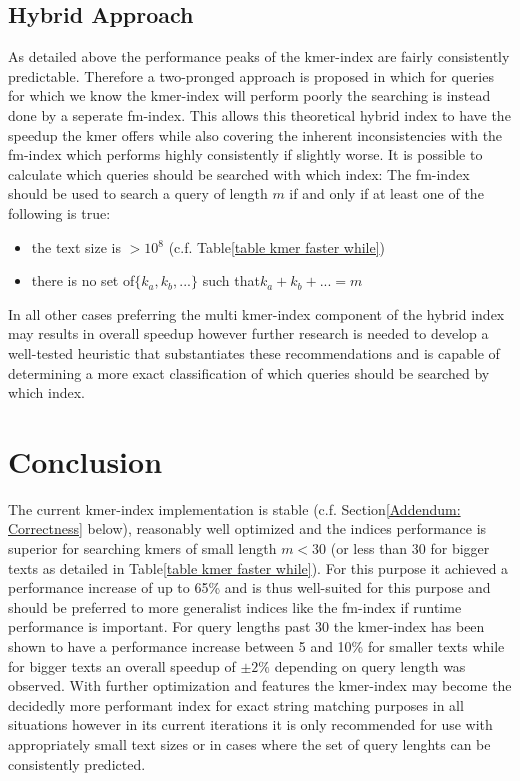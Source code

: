 \section{Hybrid Approach}
As detailed above the performance peaks of the kmer-index are fairly
consistently predictable. Therefore a two-pronged approach is proposed in which
for queries for which we know the kmer-index will perform poorly the
searching is instead done by a seperate fm-index. This allows this theoretical hybrid index
to have the speedup the kmer offers while also covering the inherent inconsistencies with the fm-index
which performs highly consistently if slightly worse. It is possible to calculate
which queries should be searched with which index: The fm-index should be used to
search a query of length $m$ if and only if at least one of the following is true:
\begin{itemize}
\item the text size is $>10{{}^8}$ (c.f. Table\ref{table kmer faster while})
\item there is no set of$\{k_{a},k_{b},...\}$ such that$k_{a}+k_{b}+...=m$
\end{itemize}
In all other cases preferring the multi kmer-index component of the hybrid index
may results in overall speedup however further research is needed to develop a well-tested
heuristic that substantiates these recommendations and is capable of determining a more
exact classification of which queries should be searched by which index.

\chapter{Conclusion}

The current kmer-index implementation is stable (c.f. Section\ref{Addendum: Correctness}
below), reasonably well optimized and the indices performance is superior
for searching kmers of small length $m<30$ (or less than
30 for bigger texts as detailed in Table\ref{table kmer faster while}).
For this purpose it achieved a performance increase of up to 65\%
and is thus well-suited for this purpose and should be preferred to more generalist
indices like the fm-index if runtime performance is important. For
query lengths past 30 the kmer-index has been shown to have a performance
increase between 5 and 10\% for smaller texts
while for bigger texts an overall speedup of $\pm2\%$ depending
on query length was observed. With further optimization and features
the kmer-index may become the decidedly more performant index for
exact string matching purposes in all situations however in its current
iterations it is only recommended for use with appropriately small
text sizes or in cases where the set of query lenghts can be consistently predicted.


